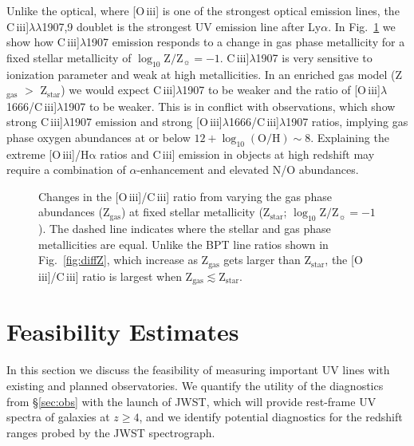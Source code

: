 \documentclass[preprint2]{aastex61}
\newcommand{\oiii}{[O\,{\sc iii}]\xspace}
\newcommand{\ciii}{C\,{\sc iii}]\xspace}
\newcommand{\ha}{\ensuremath{\mathrm{H\alpha}}\xspace}
\newcommand{\logten}{\ensuremath{\log_{10}}}
\newcommand{\logZeq}[1]{\ensuremath{\logten \mathrm{Z}/\mathrm{Z}_{\sun} = #1}}
\begin{document}
Unlike the optical, where \oiii is one of the strongest optical emission lines, the \ciii$\lambda\lambda$1907,9 doublet is the strongest UV emission line after Ly$\alpha$. In Fig.~\ref{fig:diffZCO} we show how \ciii$\lambda$1907 emission responds to a change in gas phase metallicity for a fixed stellar metallicity of \logZeq{-1}. \ciii$\lambda$1907 is very sensitive to ionization parameter and weak at high metallicities. In an enriched gas model (Z$_{\mathrm{gas}}$ $>$ Z$_{\mathrm{star}}$) we would expect \ciii$\lambda$1907 to be weaker and the ratio of \oiii$\lambda$1666/\ciii$\lambda$1907 to be weaker. This is in conflict with observations, which show strong \ciii$\lambda$1907 emission and strong \oiii$\lambda$1666/\ciii$\lambda$1907 ratios, implying gas phase oxygen abundances at or below $12+\log_{10}(\mathrm{O}/\mathrm{H})\sim 8$. Explaining the extreme \oiii/\ha ratios and \ciii emission in objects at high redshift may require a combination of $\alpha$-enhancement and elevated N/O abundances. 

\begin{figure}
  \begin{center}
    \caption{Changes in the \oiii/\ciii ratio from varying the gas phase abundances (Z$_{\mathrm{gas}}$) at fixed stellar metallicity (Z$_{\mathrm{star}}$; \logZeq{-1}). The dashed line indicates where the stellar and gas phase metallicities are equal. Unlike the BPT line ratios shown in Fig.~\ref{fig:diffZ}, which increase as $\mathrm{Z}_{\mathrm{gas}}$ gets larger than $\mathrm{Z}_{\mathrm{star}}$, the \oiii/\ciii ratio is largest when $\mathrm{Z}_{\mathrm{gas}}\lesssim \mathrm{Z}_{\mathrm{star}}$.}
    \label{fig:diffZCO}
  \end{center}
\end{figure}


\section{Feasibility Estimates} \label{sec:feas}

In this section we discuss the feasibility of measuring important UV lines with existing and planned observatories. We quantify the utility of the diagnostics from \S\ref{sec:obs} with the launch of JWST, which will provide rest-frame UV spectra of galaxies at $z \geq 4$, and we identify potential diagnostics for the redshift ranges probed by the JWST spectrograph.
\end{document}
